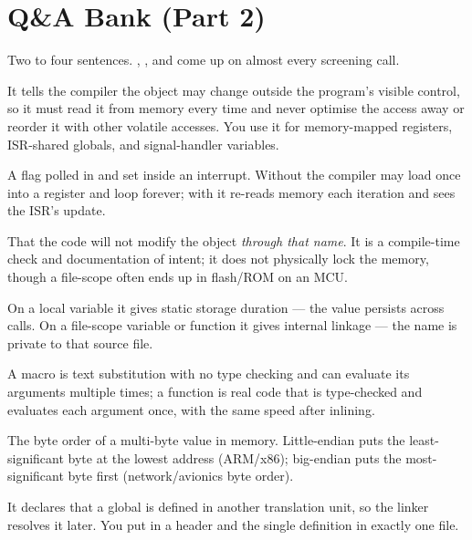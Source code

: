 \section{Q\&A Bank (Part 2)}

%
{Two to four sentences. , , and  come
up on almost every screening call.}

It tells the compiler the object may change outside the program's visible
control, so it must read it from memory every time and never optimise the
access away or reorder it with other volatile accesses. You use it for
memory-mapped registers, ISR-shared globals, and signal-handler variables.

A flag polled in  and set inside an interrupt.
Without  the compiler may load  once into a
register and loop forever; with  it re-reads memory each
iteration and sees the ISR's update.

That the code will not modify the object \emph{through that name}. It is a
compile-time check and documentation of intent; it does not physically lock
the memory, though a file-scope  often ends up in flash/ROM on an
MCU.

On a local variable it gives static storage duration --- the value persists
across calls. On a file-scope variable or function it gives internal linkage
--- the name is private to that source file.

A macro is text substitution with no type checking and can evaluate its
arguments multiple times; a  function is real code that is
type-checked and evaluates each argument once, with the same speed after
inlining.

The byte order of a multi-byte value in memory. Little-endian puts the
least-significant byte at the lowest address (ARM/x86); big-endian puts the
most-significant byte first (network/avionics byte order).

It declares that a global is defined in another translation unit, so the
linker resolves it later. You put  in a header and the
single definition  in exactly one  file.

